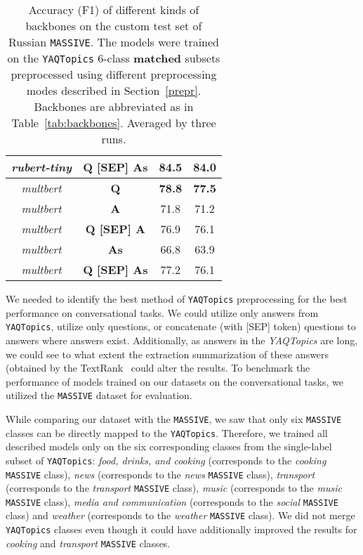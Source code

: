 \begin{table*}
{\begin{tabular}{|c|c||c|c|}
\textit{rubert-tiny} &  \textbf{Q [SEP] As} & \textbf{84.5} & \textbf{84.0}\\ \hline \hline%
\textit{multbert} &  \textbf{Q} & \textbf{78.8} & \textbf{77.5}\\ \hline%
\textit{multbert} &  \textbf{A} & 71.8 & 71.2\\ \hline%
\textit{multbert} &  \textbf{Q [SEP] A} & 76.9 & 76.1\\ \hline%
\textit{multbert} &  \textbf{As} & 66.8 & 63.9\\ \hline%
\textit{multbert} &  \textbf{Q [SEP] As} & 77.2 & 76.1\\ \hline%
\end{tabular}
}
\caption{
 Accuracy (F1) of different kinds of backbones on the custom test set of Russian \texttt{MASSIVE}.
The models were trained on the \texttt{YAQTopics} 6-class \textbf{matched} subsets preprocessed using different preprocessing modes described in Section~\ref{prepr}. Backbones are abbreviated as in Table~\ref{tab:backbones}. Averaged by three runs.}
\label{tab:matched}
\end{table*}



We needed to identify the best method of \texttt{YAQTopics} preprocessing for the best performance on conversational tasks. We could utilize only answers from \texttt{YAQTopics}, utilize only questions, or concatenate (with [SEP] token) questions to answers where answers exist. Additionally, as answers in the \textit{YAQTopics} are long, we could see to what extent the extraction summarization of these answers (obtained by the TextRank~\cite{summarizer} could alter the results. To benchmark the performance of models trained on our datasets on the conversational tasks, we utilized the \texttt{MASSIVE} dataset for evaluation.


While comparing our dataset with the \texttt{MASSIVE}, we saw that only six \texttt{MASSIVE} classes can be directly mapped to the \texttt{YAQTopics}. Therefore, we trained all described models only on the six corresponding classes from the single-label subset of \texttt{YAQTopics}: \textit{food, drinks, and cooking}  (corresponds to the \textit{cooking} \texttt{MASSIVE} class), \textit{news} (corresponds to the \textit{news} \texttt{MASSIVE} class), \textit{transport} (corresponds to the \textit{transport} \texttt{MASSIVE} class), \textit{music} (corresponds to the \textit{music} \texttt{MASSIVE} class), \textit{media and communication} (corresponds to the \textit{social} \texttt{MASSIVE} class) and \textit{weather} (corresponds to the \textit{weather} \texttt{MASSIVE} class). We did not merge \texttt{YAQTopics} classes even though it could have additionally improved the results for \textit{cooking} and \textit{transport} \texttt{MASSIVE} classes.

